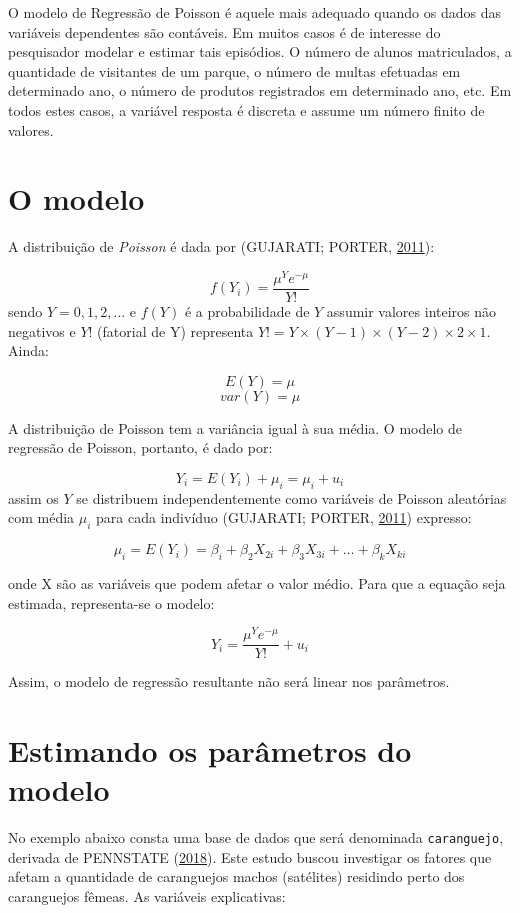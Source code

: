 \documentclass[12pt,brazil,oneside]{book}
\begin{document}
O modelo de Regressão de Poisson é aquele mais adequado quando os dados das variáveis dependentes são contáveis. Em muitos casos é de interesse do pesquisador modelar e estimar tais episódios. O número de alunos matriculados, a quantidade de visitantes de um parque, o número de multas efetuadas em determinado ano, o número de produtos registrados em determinado ano, etc. Em todos estes casos, a variável resposta é discreta e assume um número finito de valores.

\hypertarget{o-modelo-1}{%
\section{O modelo}\label{o-modelo-1}}

A distribuição de \emph{Poisson} é dada por (GUJARATI; PORTER, \protect\hyperlink{ref-Gujarati2011}{2011}):

\[
f(Y_i) = \frac{\mu^{Y}e^{-\mu}}{Y!}
\]
sendo \(Y=0,1,2,...\) e \(f(Y)\) é a probabilidade de \(Y\) assumir valores inteiros não negativos e \(Y!\) (fatorial de Y) representa \(Y! = Y \times (Y-1) \times (Y-2) \times 2 \times 1\). Ainda:

\[
E(Y) = \mu
\]
\[
var(Y) = \mu
\]

A distribuição de Poisson tem a variância igual à sua média. O modelo de regressão de Poisson, portanto, é dado por:

\[
Y_i = E(Y_i) +\mu_i = \mu_i + u_i
\]
assim os \(Y\) se distribuem independentemente como variáveis de Poisson aleatórias com média \(\mu_i\) para cada indivíduo (GUJARATI; PORTER, \protect\hyperlink{ref-Gujarati2011}{2011}) expresso:

\[
\mu_i = E(Y_i) = \beta_{i} + \beta _{2} X_{2i} + \beta_{3} X_{3i} + \dots + \beta_{k} X_{ki}
\]

onde X são as variáveis que podem afetar o valor médio. Para que a equação seja estimada, representa-se o modelo:

\[
Y_i = \frac{\mu^{Y}e^{-\mu}}{Y!} + u_i
\]

Assim, o modelo de regressão resultante não será linear nos parâmetros.

\hypertarget{estimando-os-parametros-do-modelo}{%
\section{Estimando os parâmetros do modelo}\label{estimando-os-parametros-do-modelo}}

No exemplo abaixo consta uma base de dados que será denominada \texttt{caranguejo}, derivada de PENNSTATE (\protect\hyperlink{ref-penn2018}{2018}). Este estudo buscou investigar os fatores que afetam a quantidade de caranguejos machos (satélites) residindo perto dos caranguejos fêmeas. As variáveis explicativas:
\end{document}
